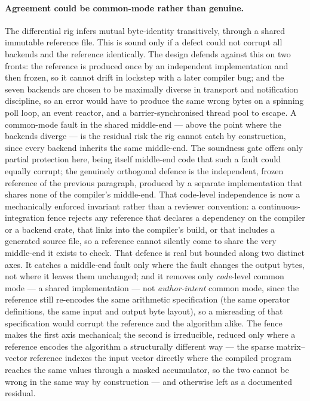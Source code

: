 \paragraph{Agreement could be common-mode rather than genuine.} The differential
rig infers mutual byte-identity transitively, through a shared immutable reference
file. This is sound only if a defect could not corrupt all backends and the
reference identically. The design defends against this on two fronts: the reference
is produced once by an independent implementation and then frozen, so it cannot
drift in lockstep with a later compiler bug; and the seven backends are chosen to
be maximally diverse in transport and notification discipline, so an error would
have to produce the same wrong bytes on a spinning poll loop, an event reactor, and
a barrier-synchronised thread pool to escape. A common-mode fault in the shared
middle-end --- above the point where the backends diverge --- is the residual risk
the rig cannot catch by construction, since every backend inherits the same
middle-end. The soundness gate offers only partial protection here, being itself
middle-end code that such a fault could equally corrupt; the genuinely orthogonal
defence is the independent, frozen reference of the previous paragraph, produced by
a separate implementation that shares none of the compiler's middle-end. That
code-level independence is now a mechanically enforced invariant rather than a
reviewer convention: a continuous-integration fence rejects any reference that
declares a dependency on the compiler or a backend crate, that links into the
compiler's build, or that includes a generated source file, so a reference cannot
silently come to share the very middle-end it exists to check. That defence is real
but bounded along two distinct axes. It catches a middle-end fault only where the
fault changes the output bytes, not where it leaves them unchanged; and it removes
only \emph{code}-level common mode --- a shared implementation --- not
\emph{author-intent} common mode, since the reference still re-encodes the same
arithmetic specification (the same operator definitions, the same input and output
byte layout), so a misreading of that specification would corrupt the reference and
the algorithm alike. The fence makes the first axis mechanical; the second is
irreducible, reduced only where a reference encodes the algorithm a structurally
different way --- the sparse matrix--vector reference indexes the input vector
directly where the compiled program reaches the same values through a masked
accumulator, so the two cannot be wrong in the same way by construction --- and
otherwise left as a documented residual.

